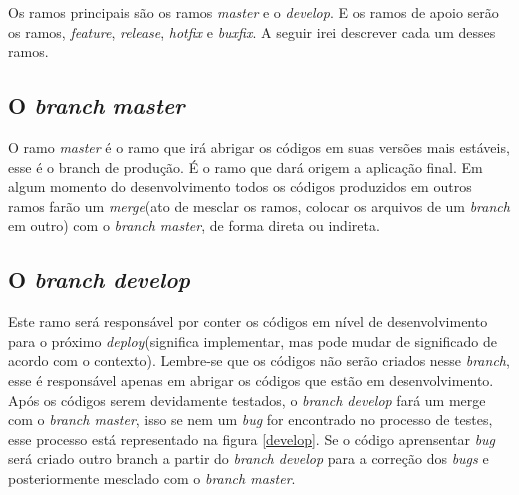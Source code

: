 \documentclass[12pt,openright,oneside,a4paper,english,brazil]{abntex2}
\begin{document}
Os ramos principais são os ramos \textit{master} e o \textit{develop}. E os ramos de apoio serão os ramos, \textit{feature}, \textit{release}, \textit{hotfix} e \textit{buxfix}. A seguir irei descrever cada um desses ramos. 


\subsection{O \textit{branch} \textit{master}}

O ramo \textit{master} é o ramo que irá abrigar os códigos em suas versões mais estáveis, esse é o branch de produção. É o ramo que dará origem a aplicação final. Em algum momento do desenvolvimento todos os códigos produzidos em outros ramos farão um \textit{merge}(ato de mesclar os ramos, colocar os arquivos de um \textit{branch} em outro) com o \textit{branch master}, de forma direta ou indireta.

\subsection{O \textit{branch develop}}

Este ramo será responsável por conter os códigos em nível de desenvolvimento para o próximo \textit{deploy}(significa implementar, mas pode mudar de significado de acordo com o contexto). Lembre-se que os códigos não serão criados nesse \textit{branch}, esse é responsável apenas em abrigar os códigos que estão em desenvolvimento. Após os códigos serem devidamente testados, o \textit{branch develop} fará um merge com o \textit{branch master}, isso se nem um \textit{bug} for encontrado no processo de testes, esse processo está representado na figura \ref{develop}. Se o código aprensentar \textit{bug} será criado outro branch a partir do \textit{branch develop} para a correção dos \textit{bugs} e posteriormente mesclado com o \textit{branch master}.
\end{document}
